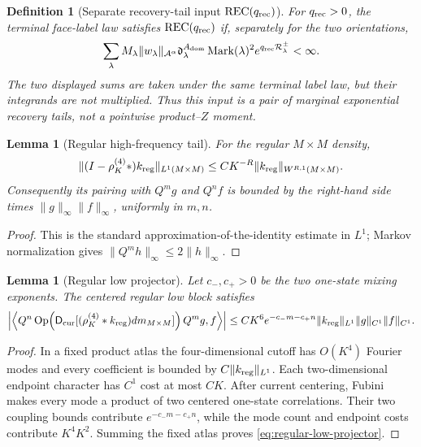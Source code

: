\documentclass[11pt]{article}
\newtheorem{lemma}[theorem]{Lemma}
\newtheorem{definition}[theorem]{Definition}
\begin{document}
\begin{definition}[Separate recovery-tail input $\mathrm{REC}(q_{\rm rec})$]
\label{def:separate-recovery-tail}
For $q_{\rm rec}>0$, the terminal face-label law satisfies
$\mathrm{REC}(q_{\rm rec})$ if, separately for the two orientations,
\begin{equation}
\label{eq:separate-recovery-moments}
 \sum_\lambda M_\lambda\|w_\lambda\|_{\mathcal A^\alpha}
 \mathfrak d_\lambda^{A_{\rm dom}}\operatorname{Mark}(\lambda)^2
 e^{q_{\rm rec}\mathcal R_\lambda^\pm}<\infty.
\end{equation}
The two displayed sums are taken under the same terminal label law, but their
integrands are not multiplied.  Thus this input is a pair of marginal
exponential recovery tails, not a pointwise product--$Z$ moment.
\end{definition}

\begin{lemma}[Regular high-frequency tail]
\label{lem:regular-high-tail}
For the regular $M\times M$ density,
\begin{equation}
\label{eq:regular-high-tail}
 \|(I-\rho_K^{(4)}*)k_{\rm reg}\|_{L^1(M\times M)}
 \le CK^{-R}\|k_{\rm reg}\|_{W^{R,1}(M\times M)}.
\end{equation}
Consequently its pairing with $Q^mg$ and $Q^nf$ is bounded by the right-hand
side times $\|g\|_\infty\|f\|_\infty$, uniformly in $m,n$.
\end{lemma}

\begin{proof}
This is the standard approximation-of-the-identity estimate in $L^1$; Markov
normalization gives $\|Q^mh\|_\infty\le2\|h\|_\infty$.
\end{proof}

\begin{lemma}[Regular low projector]
\label{lem:regular-low-projector}
Let $c_-,c_+>0$ be the two one-state mixing exponents.  The centered regular
low block satisfies
\begin{equation}
\label{eq:regular-low-projector}
 \left|\left\langle Q^n\operatorname{Op}\!\left(
 \mathsf D_{\rm cur}[(\rho_K^{(4)}*k_{\rm reg})dm_{M\times M}]
 \right)Q^mg,f\right\rangle\right|
 \le CK^6e^{-c_-m-c_+n}\|k_{\rm reg}\|_{L^1}
       \|g\|_{C^1}\|f\|_{C^1}.
\end{equation}
\end{lemma}

\begin{proof}
In a fixed product atlas the four-dimensional cutoff has $O(K^4)$ Fourier
modes and every coefficient is bounded by $C\|k_{\rm reg}\|_{L^1}$.
Each two-dimensional endpoint character has $C^1$ cost at most $CK$.
After current centering, Fubini makes every mode a product of two centered
one-state correlations.  Their two coupling bounds contribute
$e^{-c_-m-c_+n}$, while the mode count and endpoint costs contribute
$K^4K^2$.  Summing the fixed atlas proves
\eqref{eq:regular-low-projector}.
\end{proof}
\end{document}

